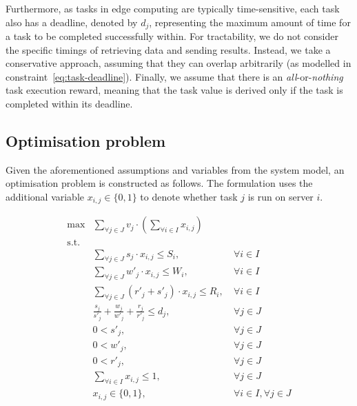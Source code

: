 Furthermore, as tasks in edge computing are typically time-sensitive, each task also has a deadline, denoted by $d_j$, representing the maximum amount of time for a task to be completed successfully within. For tractability, we do not consider the specific timings of retrieving data and sending results. Instead, we take a conservative approach, assuming that they can overlap arbitrarily (as modelled in constraint~\eqref{eq:task-deadline}). Finally, we assume that there is an \emph{all}-or-\emph{nothing} task execution reward, meaning that the task value is derived only if the task is completed within its deadline.

\subsection{Optimisation problem}
\label{subsec:optimisation-problem}
Given the aforementioned assumptions and variables from the system model, an optimisation problem is constructed as follows. The formulation uses the additional variable $x_{i,j} \in \{0,1\}$ to denote whether task $j$ is run on server $i$.

\begin{align}
    \max & \sum_{\forall j \in J} v_j \cdot \left(\sum_{\forall i \in I} x_{i,j}\right) \label{eq:objective} \\
    \mbox{s.t.} \nonumber \\
    & \sum_{\forall j \in J} s_j \cdot x_{i,j} \leq S_i, &~ \forall{i \in I} \label{eq:server-storage-constraint} \\
    & \sum_{\forall j \in J} w'_j \cdot x_{i,j} \leq W_i, &~ \forall{i \in I} \label{eq:server-computation-constraint} \\
    & \sum_{\forall j \in J} (r'_j + s'_j) \cdot x_{i,j} \leq R_i, &~ \forall{i \in I} \label{eq:server-bandwidth-constraint} \\
    & \frac{s_j}{s'_j} + \frac{w_j}{w'_j} + \frac{r_j}{r'_j} \leq d_j, &~ \forall{j \in J} \label{eq:task-deadline} \\
    & 0 < s'_j, &~ \forall{j \in J} \label{eq:loading-speeds} \\
    & 0 < w'_j, &~ \forall{j \in J} \label{eq:compute-speeds} \\
    & 0 < r'_j, &~ \forall{j \in J} \label{eq:sending-speeds} \\
    & \sum_{\forall i \in I} x_{i,j} \leq 1, &~ \forall{j \in J} \label{eq:server-task-allocation} \\
    & x_{i,j} \in \{0, 1\}, &~ \forall{i \in I},\forall{j \in J} \label{eq:task-allocation}
\end{align}

